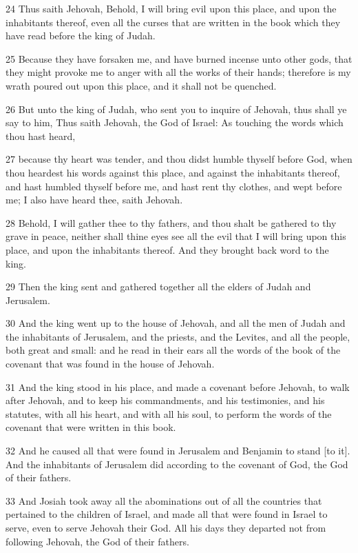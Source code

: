 \par 24 Thus saith Jehovah, Behold, I will bring evil upon this place, and upon the inhabitants thereof, even all the curses that are written in the book which they have read before the king of Judah.
\par 25 Because they have forsaken me, and have burned incense unto other gods, that they might provoke me to anger with all the works of their hands; therefore is my wrath poured out upon this place, and it shall not be quenched.
\par 26 But unto the king of Judah, who sent you to inquire of Jehovah, thus shall ye say to him, Thus saith Jehovah, the God of Israel: As touching the words which thou hast heard,
\par 27 because thy heart was tender, and thou didst humble thyself before God, when thou heardest his words against this place, and against the inhabitants thereof, and hast humbled thyself before me, and hast rent thy clothes, and wept before me; I also have heard thee, saith Jehovah.
\par 28 Behold, I will gather thee to thy fathers, and thou shalt be gathered to thy grave in peace, neither shall thine eyes see all the evil that I will bring upon this place, and upon the inhabitants thereof. And they brought back word to the king.
\par 29 Then the king sent and gathered together all the elders of Judah and Jerusalem.
\par 30 And the king went up to the house of Jehovah, and all the men of Judah and the inhabitants of Jerusalem, and the priests, and the Levites, and all the people, both great and small: and he read in their ears all the words of the book of the covenant that was found in the house of Jehovah.
\par 31 And the king stood in his place, and made a covenant before Jehovah, to walk after Jehovah, and to keep his commandments, and his testimonies, and his statutes, with all his heart, and with all his soul, to perform the words of the covenant that were written in this book.
\par 32 And he caused all that were found in Jerusalem and Benjamin to stand [to it]. And the inhabitants of Jerusalem did according to the covenant of God, the God of their fathers.
\par 33 And Josiah took away all the abominations out of all the countries that pertained to the children of Israel, and made all that were found in Israel to serve, even to serve Jehovah their God. All his days they departed not from following Jehovah, the God of their fathers.

